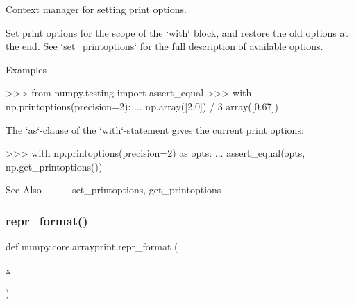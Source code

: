 \begin{DoxyVerb}Context manager for setting print options.

Set print options for the scope of the `with` block, and restore the old
options at the end. See `set_printoptions` for the full description of
available options.

Examples
--------

>>> from numpy.testing import assert_equal
>>> with np.printoptions(precision=2):
...     np.array([2.0]) / 3
array([0.67])

The `as`-clause of the `with`-statement gives the current print options:

>>> with np.printoptions(precision=2) as opts:
...      assert_equal(opts, np.get_printoptions())

See Also
--------
set_printoptions, get_printoptions\end{DoxyVerb}
 \mbox{\label{namespacenumpy_1_1core_1_1arrayprint_ae4f6d86caeb40ebd108226ac39bc65d1}} 
\subsubsection{\texorpdfstring{repr\+\_\+format()}{repr\_format()}}
{\footnotesize\ttfamily def numpy.\+core.\+arrayprint.\+repr\+\_\+format (\begin{DoxyParamCaption}\item[{}]{x }\end{DoxyParamCaption})}

\mbox{\label{namespacenumpy_1_1core_1_1arrayprint_a16c960f486a3a0cf4a3c83a0dbc18503}} 
